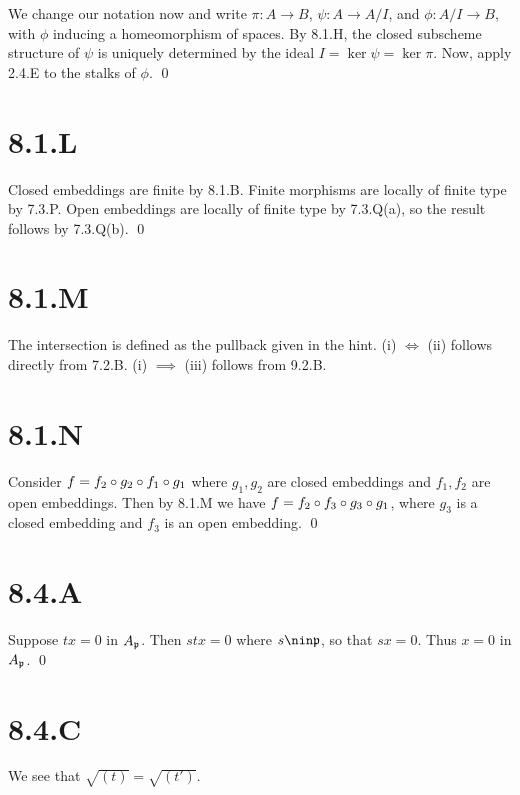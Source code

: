 \documentclass{article}
\begin{document}
We change our notation now and write $\pi: A \to B$,
$\psi: A \to A/I$, and $\phi: A/I \to B$, with $\phi$
inducing a homeomorphism of spaces. By 8.1.H, the closed subscheme structure of
$\psi$ is uniquely determined by the ideal
$I=\ker \psi = \ker \pi$. Now, apply 2.4.E to the stalks of
$\phi$. \qed

\section{8.1.L}
Closed embeddings are finite by 8.1.B. Finite morphisms are locally of finite
type by 7.3.P. Open embeddings are locally of finite type by 7.3.Q(a), so the
result follows by 7.3.Q(b). \qed

\section{8.1.M}
The intersection is defined as the pullback given in the hint. (i)
$\iff$ (ii) follows directly from 7.2.B. (i)
$\implies$ (iii) follows from 9.2.B.

\section{8.1.N}
Consider $f=f_2 \circ g_2 \circ f_1 \circ g_1$ where $g_1, g_2$ are closed
embeddings and $f_1, f_2$ are open embeddings. Then by 8.1.M we
have $f=f_2 \circ f_3 \circ g_3 \circ g_1$, where $g_3$ is a closed embedding
and $f_3$ is an open embedding. \qed

\section{8.4.A}
Suppose $tx=0$ in $A_{\mathfrak{p}}$. Then
$stx=0$ where $s \nin \p$, so that
$sx=0$. Thus $x=0$ in $A_{\mathfrak{p}}$.
\qed

\section{8.4.C}
We see that $\sqrt{(t)}=\sqrt{(t')}$.
\end{document}
